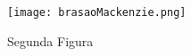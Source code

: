 \begin{figure}[h]
    \centering
    \texttt{[image: brasaoMackenzie.png]}
    \caption{Segunda Figura}
    \label{fig:mesh2}
\end{figure}